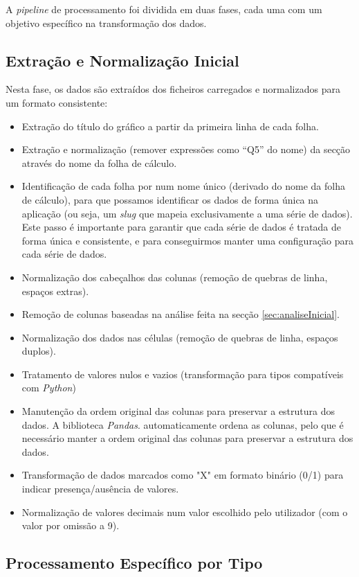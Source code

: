 A \textit{pipeline} de processamento foi dividida em duas fases, cada uma com um objetivo específico na transformação dos dados.

\subsection{Extração e Normalização Inicial}

Nesta fase, os dados são extraídos dos ficheiros carregados e normalizados para um formato consistente:

\begin{itemize}
    \item Extração do título do gráfico a partir da primeira linha de cada folha.
    \item Extração e normalização (remover expressões como ``Q5'' do nome) da secção através do nome da folha de cálculo.
    \item Identificação de cada folha por num nome único (derivado do nome da folha de cálculo), para que possamos identificar os dados de forma única na aplicação (ou seja, um \textit{slug} que mapeia exclusivamente a uma série de dados). Este passo é importante para garantir que cada série de dados é tratada de forma única e consistente, e para conseguirmos manter uma configuração para cada série de dados.
    \item Normalização dos cabeçalhos das colunas (remoção de quebras de linha, espaços extras).
    \item Remoção de colunas baseadas na análise feita na secção \ref{sec:analiseInicial}.
    \item Normalização dos dados nas células (remoção de quebras de linha, espaços duplos).
    \item Tratamento de valores nulos e vazios (transformação para tipos compatíveis com \textit{Python})
    \item Manutenção da ordem original das colunas para preservar a estrutura dos dados. A biblioteca \textit{Pandas}. automaticamente ordena as colunas, pelo que é necessário manter a ordem original das colunas para preservar a estrutura dos dados.
    \item Transformação de dados marcados como "X" em formato binário (0/1) para indicar presença/ausência de valores.
    \item Normalização de valores decimais num valor escolhido pelo utilizador (com o valor por omissão a 9).
\end{itemize}

\subsection{Processamento Específico por Tipo}

